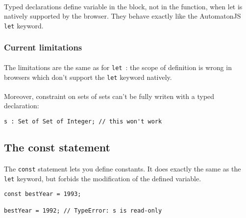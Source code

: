 \documentclass{article}
\begin{document}
\begin{sloppypar}
      

      
\paragraph{}
Typed declarations define variable in the block, not in the function, when let is natively supported by the browser. They behave exactly like the AutomatonJS \lstinline!let! keyword.

      

\subsubsection{ Current limitations}


\paragraph{}
The limitations are the same as for \lstinline!let! : the scope of definition is wrong in browsers which don't support the \lstinline!let! keyword natively.

         
\paragraph{}
Moreover, constraint on sets of sets can't be fully writen with a typed declaration:
{\begin{lstlisting}
s : Set of Set of Integer; // this won't work
\end{lstlisting}
}

      
   

   

\subsection{ The const statement}


\paragraph{}
The \lstinline!const! statement lets you define constants. It does exactly the same as the \lstinline!let! keyword, but forbids the modification of the defined variable.
      
{\begin{lstlisting}
const bestYear = 1993;

bestYear = 1992; // TypeError: s is read-only
\end{lstlisting}
}


\end{sloppypar}
\end{document}
